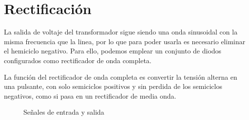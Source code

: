\documentclass[chaptersright]{informeutn}
\begin{document}
      \section{Rectificación}
        La salida de voltaje del transformador sigue siendo una onda sinusoidal con la misma frecuencia que la linea,
        por lo que para poder usarla es necesario eliminar el hemiciclo negativo. Para ello, podemos emplear un
        conjunto de diodos configurados como rectificador de onda completa.

        La función del rectificador de onda completa es convertir la tensión alterna en una pulsante, con solo
        semiciclos positivos y sin perdida de los semiciclos negativos, como si pasa en un rectificador de media
        onda.
        \begin{figure}[!h]
          \noindent
          \centering
          \begin{minipage}[t][5cm][c]{0.4\textwidth}
            \centering
          \end{minipage}
          \begin{minipage}[t][5cm][c]{0.4\textwidth}
            \centering
          \end{minipage}
          \caption{Señales de entrada y salida}
        \end{figure}
\end{document}
